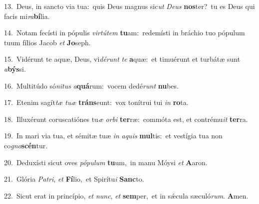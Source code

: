 {\numbfont\textcolor{\numbcolor}{13.}}~Deus, in sancto via tua:~\dagger quis Deus magnus sic\textit{ut} \textit{De}\-\textit{us} \textbf{nos}\-ter?~\star tu es Deus qui facis mi\-\textit{ra}\-\textbf{bí}lia.\par
{\numbfont\textcolor{\numbcolor}{14.}}~Notam fecísti in pópulis \textit{vir}\-\textit{tú}\textit{tem} \textbf{tu}\-am:~\star redemísti in bráchio tuo pópulum tuum fílios Jacob \textit{et} \textbf{Jo}\-seph.\par
{\numbfont\textcolor{\numbcolor}{15.}}~Vidérunt te aquæ, Deus, vi\-\textit{dé}\-\textit{runt} \textit{te} \textbf{a}\-quæ:~\star et timuérunt et turbátæ sunt \textit{a}\-\textbf{býs}si.\par
{\numbfont\textcolor{\numbcolor}{16.}}~Multitúdo só\-\textit{ni}\-\textit{tus} \textit{a}\-\textbf{quá}rum:~\star vocem dedé\textit{runt} \textbf{nu}\-bes.\par
{\numbfont\textcolor{\numbcolor}{17.}}~Etenim sagít\textit{tæ} \textit{tu}\-\textit{æ} \textbf{tráns}\-eunt:~\star vox tonítrui tui \textit{in} \textbf{ro}\-ta.\par
{\numbfont\textcolor{\numbcolor}{18.}}~Illuxérunt coruscatiónes tu\textit{æ} \textit{or}\-\textit{bi} \textbf{ter}\-ræ:~\star commóta est, et contrému\textit{it} \textbf{ter}\-ra.\par
{\numbfont\textcolor{\numbcolor}{19.}}~In mari via tua, et sémitæ tuæ \textit{in} \textit{a}\-\textit{quis} \textbf{mul}\-tis:~\star et vestígia tua non co\-\textit{gno}\-\textbf{scén}tur.\par
{\numbfont\textcolor{\numbcolor}{20.}}~Deduxísti sicut oves \textit{pó}\-\textit{pu}\textit{lum} \textbf{tu}\-um,~\star in manu Móysi \textit{et} \textbf{A}\-aron.\par
{\numbfont\textcolor{\numbcolor}{21.}}~Glória \textit{Pa}\-\textit{tri}, \textit{et} \textbf{Fí}\-lio,~\star et Spirítu\textit{i} \textbf{Sanc}\-to.\par
{\numbfont\textcolor{\numbcolor}{22.}}~Sicut erat in princípio, \textit{et} \textit{nunc}\-, \textit{et} \textbf{sem}\-per,~\star et in sǽcula sæculó\-\textit{rum}\-. \textbf{A}\-men.\par

